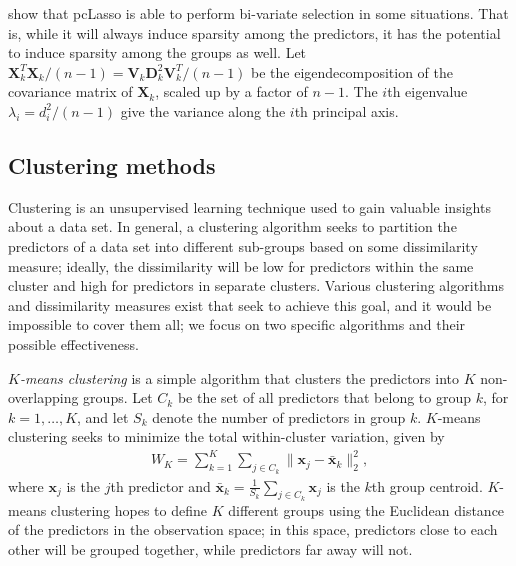 \documentclass[11pt]{article}
\newcommand{\citeay}[1]{\citeauthor{#1} \citeyear{#1}}
\begin{document}
\citeay{2018arXiv181004651T} show that pcLasso is able to perform bi-variate selection in some situations. That is, while it will always induce sparsity among the predictors, it has the potential to induce sparsity among the groups as well. Let $\mathbf{X}_k^T \mathbf{X}_k/(n-1) = \mathbf{V}_k \mathbf{D}_k^2 \mathbf{V}_k^T/(n-1)$ be the eigendecomposition of the covariance matrix of $\mathbf{X}_k$, scaled up by a factor of $n - 1$. The $i$th eigenvalue $\lambda_i = d_i^2/(n-1)$ give the variance along the $i$th principal axis. 


\subsection{Clustering methods}

Clustering is an unsupervised learning technique used to gain valuable insights about a data set. In general, a clustering algorithm seeks to partition the predictors of a data set into different sub-groups based on some dissimilarity measure; ideally, the dissimilarity will be low for predictors within the same cluster and high for predictors in separate clusters. Various clustering algorithms and dissimilarity measures exist that seek to achieve this goal, and it would be impossible to cover them all; we focus on two specific algorithms and their possible effectiveness.

\textit{$K$-means clustering} \cite{macqueen1967some} is a simple algorithm that clusters the predictors into $K$ non-overlapping groups. Let $C_k$ be the set of all predictors that belong to group $k$, for $k = 1, \ldots, K$, and let $S_k$ denote the number of predictors in group $k$. $K$-means clustering seeks to minimize the total within-cluster variation, given by 
\begin{align}
    \label{totwithinclusvar}
    W_K = \sum_{k=1}^K \sum_{j \in C_k} \| \mathbf{x}_j - \bar{\mathbf{x}}_k \|_2^2,
\end{align}
where $\mathbf{x}_j$ is the $j$th predictor and $\bar{\mathbf{x}}_k = \frac{1}{S_k} \sum_{j \in C_k} \mathbf{x}_j$ is the $k$th group centroid. $K$-means clustering hopes to define $K$ different groups using the Euclidean distance of the predictors in the observation space; in this space, predictors close to each other will be grouped together, while predictors far away will not. %
\end{document}
